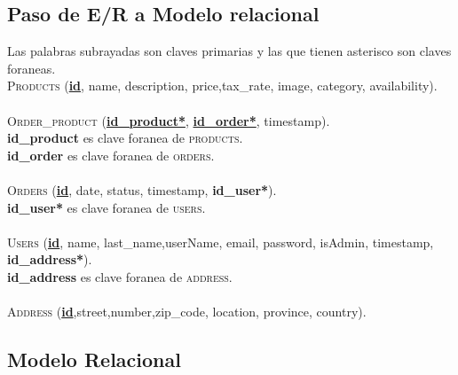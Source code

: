 \documentclass{article}
\begin{document}
\subsection{Paso de E/R a Modelo relacional}
\quad Las palabras subrayadas son claves primarias y las que tienen asterisco son claves foraneas.\\
\textsc{Products} (\underline{\textbf{id}}, name, description, price,tax\_rate, image, category, availability).\\\\
\textsc{Order\_product} (\underline{\textbf{id\_product*}}, \underline{\textbf{id\_order*}}, timestamp).\\
\textbf{id\_product} es clave foranea de \textsc{products}.\\
\textbf{id\_order} es clave foranea de \textsc{orders}.\\\\
\textsc{Orders} (\underline{\textbf{id}}, date, status, timestamp, \textbf{id\_user*}).\\
\textbf{id\_user*} es clave foranea de \textsc{users}.\\\\
\textsc{Users} (\underline{\textbf{id}}, name, last\_name,userName, email, password, isAdmin, timestamp, \textbf{id\_address*}).\\
\textbf{id\_address} es clave foranea de \textsc{address}.\\\\
\textsc{Address} (\underline{\textbf{id}},street,number,zip\_code, location, province, country).

\subsection{Modelo Relacional}
\end{document}

